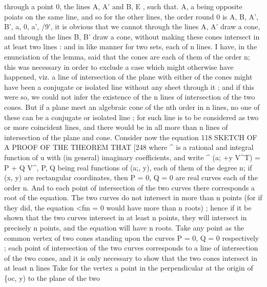 \documentclass[11pt,a4paper]{book}
\begin{document}
through  a  point  0,  the  lines  A,  A'  and  B,  E ,  such  that.  A,  a  being  opposite  poiats
on  the  same  line,  and  so  for  the  other  lines,  the  order  round  0  is  A,  B,  A',  B',
a,  0,  a',  /9',  it  is  obvious  that  we  cannot  through  the  lines  A,  A'  draw  a  cone,  and
through  the  lines  B,  B'  draw  a  cone,  without  making  these  cones  intersect  in  at  least
two  lines  :  and  in  like  manner  for  two  sets,  each  of  n  lines.  I  have,  in  the  enunciation
of  the  lemma,  said  that  the  cones  are  each  of  them  of  the  order  n;  this  was
necessary  in  order  to  exclude  a  case  which  might  otherwise  have  happened,  viz.  a
line  of  intersection  of  the  plane  with  either  of  the  cones  might  have  been  a  conjugate
or  isolated  line  without  any  sheet  through  it ;  and  if  this  were  so,  we  could  not  infer
the  existence  of  the  n  lines  of  intersection  of  the  two  cones.  But  if  a  plane  meet
an  algebraic  cone  of  the  nth  order  in  n  lines,  no  one  of  these  can  be  a  conjugate
or  isolated  line ;  for  such  line  is  to  be  considered  as  two  or  more  coincident  lines,
and  there  would  be  in  all  more  than  n  lines  of  intersection  of  the  plane  and  cone.
Consider  now  the  equation
118  SKETCH  OF  A  PROOF  OF  THE  THEOREM  THAT  [248
where  ^  is  a  rational  and  integral  function  of  u  with  (in  general)  imaginary  coefficients,
and  write
^  (a; +y  V^T)  =  P  +  Q  V^,
P,  Q  being  real  functions  of  (a;,  y),  each  of  them  of  the  degree  n;  if  (x,  y)  are
rectangular  coordinates,  then  P  =  0,  Q  =  0  are  real  curves  each  of  the  order  n.  And
to  each  point  of  intersection  of  the  two  curves  there  corresponds  a  root  of  the
equation.  The  two  curves  do  not  intersect  in  more  than  n  points  (for  if  they  did,
the  equation  <fm  =  0  would  have  more  than  n  roots) ;  hence  if  it  be  shown  that  the
two  curves  intersect  in  at  least  n  points,  they  will  intersect  in  precisely  n  points,  and
the  equation  will  have  n  roots.  Take  any  point  as  the  common  vertex  of  two  cones
standing  upon  the  curves  P  =  0,  Q  =  0  respectively ;  each  point  of  intersection  of  the
two  curves  corresponds  to  a  line  of  intersection  of  the  two  cones,  and  it  is  only
necessary  to  show  that  the  two  cones  intersect  in  at  least  n  lines  Take  for  the
vertex  a  point  in  the  perpendicular  at  the  origin  of  \{oc,  y)  to  the  plane  of  the  two
\end{document}
